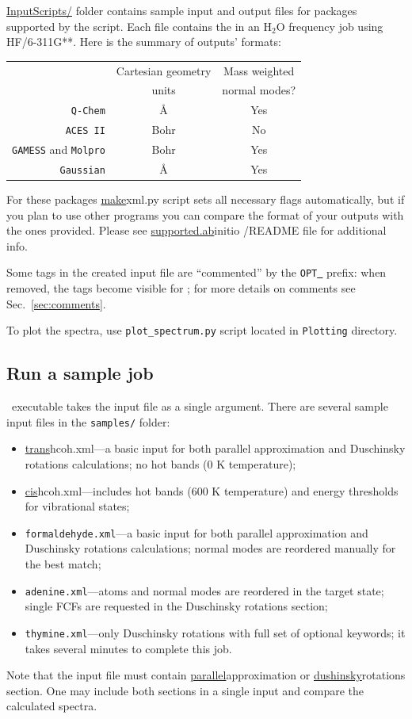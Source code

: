 \documentclass[11pt]{article}
\begin{document}
\ul{InputScripts/} folder contains sample input and output files
for \ai packages supported by the script.
Each file contains the in an H$_2$O frequency job using HF/6-311G**.
Here is the summary of \ai outputs' formats:

\begin{center}
\begin{tabular}{rcc}
\hline
  & Cartesian geometry & Mass weighted\\
  & units              & normal modes? \\
\hline
{\tt Q-Chem} & \AA & Yes\\
{\tt ACES II}  & Bohr & No\\
{\tt GAMESS} and {\tt Molpro}  & Bohr & Yes\\
{\tt Gaussian}  & \AA & Yes\\
\hline
\end{tabular}
\end{center}

For these packages \ul{make}{xml.py} script sets all necessary flags automatically,
but if you plan to use other \ai programs you can compare the format of your
outputs with the ones provided. Please see \ul{supported.ab}{initio /README} 
file for additional info.

Some tags in the created input \xml file are ``commented'' by
the {\tt OPT\underline{~}} prefix: when removed, the tags become
visible for \ezFCF; for more details on comments see Sec.~\ref{sec:comments}.

To plot the spectra, use {\tt plot\_spectrum.py} script located in {\tt Plotting} directory.  

\subsection{Run a sample job}

\ezFCF\ executable takes the input \xml file as a single argument. 
There are several sample input \xml files in the {\tt samples/} folder:
\begin{itemize}
\item \ul{trans}{hcoh.xml}---a basic input for both parallel approximation and Duschinsky rotations calculations; 
no hot bands (0 K temperature); 
\item \ul{cis}{hcoh.xml}---includes hot bands (600 K temperature) and energy thresholds for vibrational states;
\item {\tt formaldehyde.xml}---a basic input for both parallel approximation and Duschinsky rotations calculations;
normal modes are reordered manually for the best match;
\item {\tt adenine.xml}---atoms and normal modes are reordered in the target state; single FCFs are requested 
in the Duschinsky rotations section;
\item {\tt thymine.xml}---only Duschinsky rotations with full set of optional keywords; 
it takes several minutes to complete this job.
\end{itemize}
Note that the input file must contain \ul{parallel}{approximation} or \ul{dushinsky}{rotations} section.
One may include both sections in a single input and compare the calculated spectra.
\end{document}

